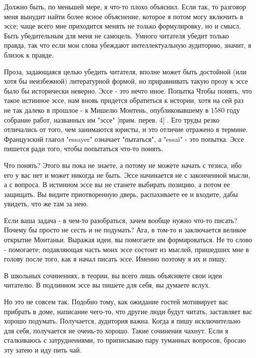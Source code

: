 \documentclass[ebook,12pt,oneside,openany]{memoir}
\begin{document}
Должно быть, по меньшей мере, я что-то плохо объяснил. Если так, то
разговор меня вынудит найти более ясное объяснение, которое я потом
могу включить в эссе; чаще всего мне приходится менять не только
формулировку, но и смысл. Быть убедительным для меня не самоцель.
Умного читателя убедит только правда, так что если мои слова убеждают
интеллектуальную аудиторию, значит, я близок к правде.

Проза, задающаяся целью убедить читателя, вполне может быть достойной
(или хотя бы неизбежной) литературной формой, но приравнивать такую
прозу к эссе было бы исторически неверно. Эссе - это нечто иное.
Попытка Чтобы понять, что такое истинное эссе, нам вновь придется
обратиться к истории, хотя на сей раз не так далеко в прошлое - к
Мишелю Монтень, опубликовавшему в 1580 году собрание работ, названных
им "эссе" [прим. перев. 4] . Его труды резко отличались от того, чем
занимаются юристы, и это отличие отражено в термине. Французский
глагол "essayer" означает "пытаться", а "essai" - это попытка. Эссе
пишется ради того, чтобы попытаться что-то понять.

Что понять? Этого вы пока не знаете, а потому не можете начать с
тезиса, ибо его у вас нет и может никогда не быть. Эссе начинается не
с законченной мысли, а с вопроса. В истинном эссе вы не станете
выбирать позицию, а потом ее защищать. Вы видите приотворенную дверь,
распахиваете ее и входите, дабы увидеть, что же там за нею.

Если ваша задача - в чем-то разобраться, зачем вообще нужно что-то
писать? Почему бы просто не сесть и не подумать? Ага, в том-то и
заключается великое открытие Монтаньи. Выражая идеи, вы помогаете им
формироваться. Не то слово - помогаете; подавляющая часть моих эссе
состоит из мыслей, пришедших мне в голову после того, как я начал
писать эссе. Именно поэтому я их и пишу.

В школьных сочинениях, в теории, вы всего лишь объясняете свои идеи
читателю. В подлинном эссе вы пишете для себя, вы думаете вслух.

Но это не совсем так. Подобно тому, как ожидание гостей мотивирует вас
прибрать в доме, написание чего-то, что другие люди будут читать,
заставляет вас хорошо подумать. Получается, аудитория важна. Когда я
пишу исключительно для себя, получается не очень-то хорошо. Такие
сочинения чахнут. Если я сталкиваюсь с затруднениями, то приписываю
пару туманных вопросов, бросаю эту затею и иду пить чай.
\end{document}
